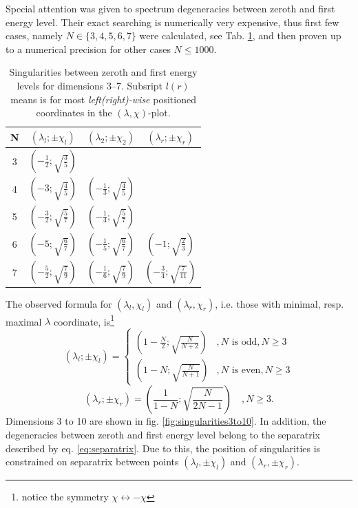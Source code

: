 Special attention was given to spectrum degeneracies between zeroth and first energy level. Their exact searching is numerically very expensive, thus first few cases, namely $N\in\{3,4,5,6,7\}$ were calculated, see Tab. \ref{tab:singularities}, and then proven up to a numerical precision for other cases $N\leq1000$.  
\begin{table}[H]
    \centering
    \begin{tabular}{c||c|c|c}
     N&$(\lambda_l;\pm\chi_l)$&$(\lambda_2;\pm\chi_2)$&$(\lambda_r;\pm\chi_r)$        \\ \hline\hline
     3&$(-\frac{1}{2};\sqrt{\frac{3}{5}}) $&                                    &        \\
     4&$(-3          ;\sqrt{\frac{4}{5}}) $& $(-\frac{1}{3};\sqrt{\frac{4}{5}})$&        \\
     5&$(-\frac{3}{2};\sqrt{\frac{5}{7}}) $& $(-\frac{1}{4};\sqrt{\frac{5}{7}})$&        \\
     6&$(-5          ;\sqrt{\frac{6}{7}}) $& $(-\frac{1}{5};\sqrt{\frac{6}{7}})$&$(-1          ;\sqrt{\frac{2}{3}}) $        \\
     7&$(-\frac{5}{2};\sqrt{\frac{7}{9}}) $& $(-\frac{1}{6};\sqrt{\frac{7}{9}})$&$(-\frac{3}{4};\sqrt{\frac{7}{11}}) $   
    \end{tabular}
    \caption{Singularities between zeroth and first energy levels for dimensions 3--7. Subsript $l(r)$ means is for most \emph{left(right)-wise} positioned coordinates in the $(\lambda,\chi)$-plot.}
    \label{tab:singularities}
    \end{table}
The observed formula for $(\lambda_l,\chi_l)$ and $(\lambda_r,\chi_r)$, i.e. those with minimal, resp. maximal $\lambda$ coordinate, is\footnote{notice the symmetry $\chi\leftrightarrow -\chi$}
\begin{equation}
    (\lambda_l ;\pm\chi_l)= \begin{cases}
        \left(1-\frac{N}{2};\sqrt{\frac{N}{N+2}}\right) & ,N\text{ is odd}, N\geq 3\\
        \left(1-N;\sqrt{\frac{N}{N+1}}\right) & ,N\text{ is even}, N\geq 3
    \end{cases}
    \label{eq:singularityCoordinateFormulaLeft}
\end{equation}
\begin{equation}
    (\lambda_r ;\pm\chi_r)= 
        \left(\frac{1}{1-N};\sqrt{\frac{N}{2N-1}}\right)\quad , N\geq 3.
        \label{eq:singularityCoordinateFormulaRight}
\end{equation}
Dimensions 3 to 10 are shown in fig. \ref{fig:singularities3to10}.
In addition, the degeneracies between zeroth and first energy level belong to the separatrix described by eq. \ref{eq:separatrix}. Due to this, the position of singularities is constrained on separatrix between points $(\lambda_l,\pm\chi_l)$ and $(\lambda_r,\pm\chi_r)$.



